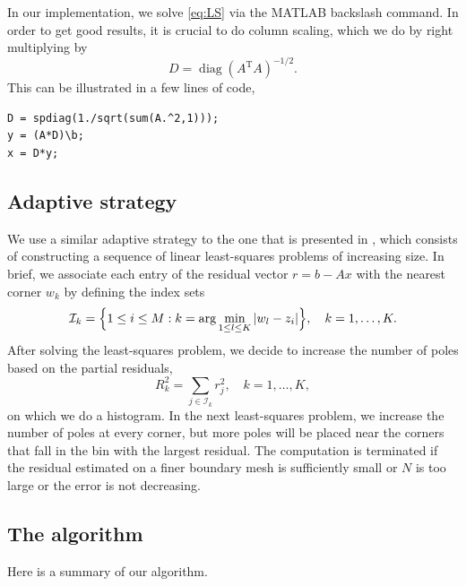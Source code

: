 \documentclass{article}
\newcommand{\transp}{\text{T}}
\DeclareMathOperator{\diag}{diag}
\begin{document}
In our implementation, we solve \eqref{eq:LS} via the MATLAB backslash command.
In order to get good results, it is crucial to do column scaling, which we do
by right multiplying by
\begin{equation}
D=\diag( A^\transp A)^{-1/2}.
\end{equation} 
This can be illustrated in a few lines of code,
\begin{verbatim}
D = spdiag(1./sqrt(sum(A.^2,1)));
y = (A*D)\b; 
x = D*y;
\end{verbatim}


\subsection{Adaptive strategy}
We use a similar adaptive strategy to the one that is presented in
\cite{gopal19}, which consists of constructing a sequence of linear
least-squares problems of increasing size. In brief, we associate each entry of
the residual vector $r=b-Ax$ with the nearest corner $w_k$ by defining the
index sets
\begin{equation}
\mathcal{I}_k = \Big\{1\leq i\leq M : k=\arg\min_{1\leq l \leq K} \abs{w_l-z_i}\Big\},\quad k=1,\ldots, K.
\end{equation}
After solving the least-squares problem, we decide to increase the number of
poles based on the partial residuals, 
\begin{equation}
R_k^2 = \sum_{j\in \mathcal{I}_k} r_j^2,\quad k=1,\ldots, K,
\end{equation}
on which we do a histogram. In the next least-squares problem, we increase the
number of poles at every corner, but more poles will be placed near the corners
that fall in the bin with the largest residual. The computation is terminated
if the residual estimated on a finer boundary mesh is sufficiently small or $N$
is too large or the error is not decreasing.


\subsection{The algorithm}
Here is a summary of our algorithm. 
\end{document}
